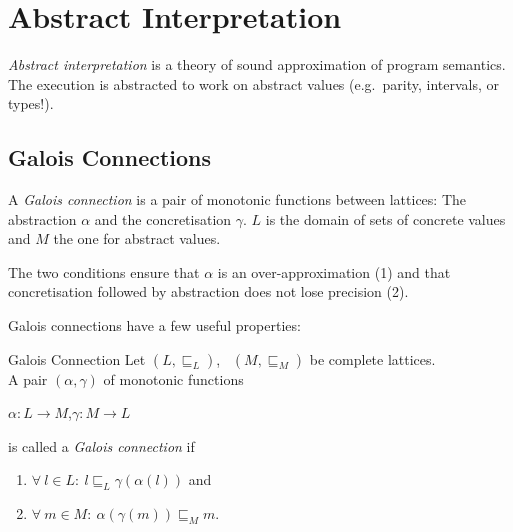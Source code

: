 \documentclass[english]{panikzettel}
\begin{document}
\section{Abstract Interpretation}

\emph{Abstract interpretation} is a theory of sound approximation of program semantics.
The execution is abstracted to work on abstract values (e.g.\ parity, intervals, or types!).

\subsection{Galois Connections}

\begin{halfboxl}
    A \emph{Galois connection} is a pair of monotonic functions between lattices: The abstraction $\alpha$ and the concretisation $\gamma$.
    $L$ is the domain of sets of concrete values and $M$ the one for abstract values.

    The two conditions ensure that $\alpha$ is an over-approximation (1) and that concretisation followed by abstraction does not lose precision (2).

    Galois connections have a few useful properties:
\end{halfboxl}%
\begin{halfboxr}
    \vspace{-\baselineskip}
    \begin{defi}{Galois Connection}
        Let $(L, \sqsubseteq_L)$,~ $(M, \sqsubseteq_M)$ be complete lattices. \\
        A pair $(\alpha, \gamma)$ of monotonic functions
        \begin{tightcenter}
            $\alpha : L \to M$,\quad $\gamma : M \to L$
        \end{tightcenter}
        is called a \emph{Galois connection} if
        \begin{enumerate}
            \item $\forall~ l \in L:~ l \sqsubseteq_L \gamma(\alpha(l))$ and
            \item $\forall~m \in M:~ \alpha(\gamma(m)) \sqsubseteq_M m$.
        \end{enumerate}
    \end{defi}
\end{halfboxr}
\vspace{-\baselineskip}
\end{document}
